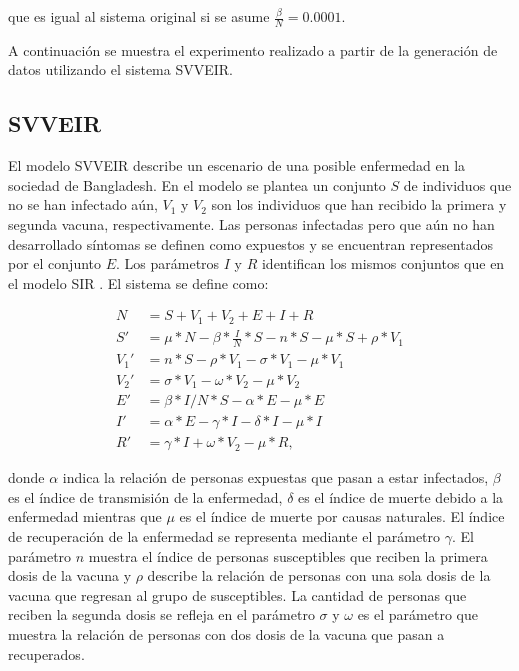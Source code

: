 que es igual al sistema original si se asume $\frac{\beta}{N} = 0.0001$.

A continuación se muestra el experimento realizado a partir de la generación de datos utilizando el sistema SVVEIR.

\subsection{SVVEIR}

El modelo SVVEIR describe un escenario de una posible enfermedad en la sociedad de Bangladesh. En el modelo se plantea un conjunto $S$ de individuos que no se han infectado aún, $V_1$ y $V_2$ son los individuos que han recibido la primera y segunda vacuna, respectivamente. Las personas infectadas pero que aún no han desarrollado síntomas se definen como expuestos y se encuentran representados por el conjunto $E$. Los parámetros $I$ y $R$ identifican los mismos conjuntos que en el modelo SIR \cite{kuddus2021mathematical}. El sistema se define como:


\begin{align*}
    N    & = S + V_1 + V_2 + E + I + R                                        \\
    S'   & = \mu * N - \beta * \frac{I}{N} * S - n * S - \mu * S + \rho * V_1 \\
    V_1' & = n * S - \rho * V_1 - \sigma * V_1 - \mu * V_1                    \\
    V_2' & = \sigma * V_1 - \omega * V_2 - \mu * V_2                          \\
    E'   & = \beta * I / N * S - \alpha * E - \mu * E                         \\
    I'   & = \alpha * E - \gamma * I - \delta * I - \mu * I                   \\
    R'   & = \gamma * I + \omega * V_2 - \mu * R,
\end{align*}

donde $\alpha$ indica la relación de personas expuestas que pasan a estar infectados, $\beta$ es el índice de transmisión de la enfermedad, $\delta$ es el índice de muerte debido a la enfermedad mientras que $\mu$ es el índice de muerte por causas naturales. El índice de recuperación de la enfermedad se representa mediante el parámetro $\gamma$. El parámetro $n$ muestra el índice de personas susceptibles que reciben la primera dosis de la vacuna y $\rho$ describe la relación de personas con una sola dosis de la vacuna que regresan al grupo de susceptibles. La cantidad de personas que reciben la segunda dosis se refleja en el parámetro $\sigma$ y $\omega$ es el parámetro que muestra la relación de personas con dos dosis de la vacuna que pasan a recuperados.

